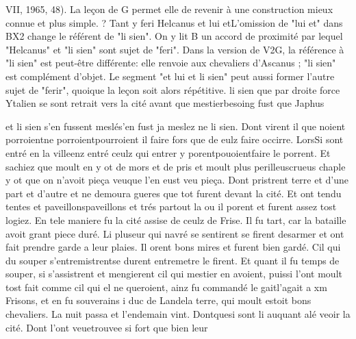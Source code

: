 \documentclass{article}
\begin{document}
\begin{pages}
                     VII, 1965, 48). La leçon de G permet elle de revenir à une construction mieux
                     connue et plus simple. ? Tant 
                  y
               feri Helcanus et 
                  lui etL'omission de "lui et" dans BX2 change le référent de
                  "li sien". On y lit B un accord de proximité par lequel "Helcanus" et "li sien"
                  sont sujet de "feri". Dans la version de V2G, la référence à "li sien" est
                  peut-être différente: elle renvoie aux chevaliers d'Ascanus ; "li sien" est
                  complément d'objet. Le segment "et lui et li sien" peut aussi former l'autre sujet
                  de "ferir", quoique la leçon soit alors répétitive. li sien que par droite
               force Ytalien se sont retrait vers la cité avant que 
                  mestierbesoing fust que Japhus
               
                  et li sien s’en fussent meslés'en fust ja meslez ne li sien. Dont virent il que noient 
                  porroientne porroientpourroient il faire 
                  fors que de eulz faire occirre. 
                  LorsSi sont entré 
                  en la villeenz entré ceulz qui 
                  entrer y 
                        porentpouoientfaire le porrent. Et sachiez que moult en y ot de mors et de pris 
                  et moult plus 
                        perilleuscrueus chaple 
                        y ot que on n’avoit pieça veuque l'en eust veu pieça. Dont pristrent terre et d’une part et d’autre et ne demoura gueres que tot
               furent devant la cité. Et ont tendu 
                  tentes et paveillonspaveillons et trés partout la ou il porent et furent assez tost logiez. En tele maniere fu la cité assise de ceulz de Frise. Il fu tart, car la bataille avoit grant piece duré. Li pluseur
               qui navré se sentirent se firent desarmer et ont fait prendre garde a leur plaies. Il
               orent bons mires et furent bien gardé. Cil qui du souper 
                  s’entremistrentse durent entremetre le firent. Et quant il fu temps de souper, 
                  si s’assistrent et mengierent cil qui mestier en avoient,
                     puissi l'ont moult tost fait comme cil qui el ne queroient, ainz fu commandé 
                  le gaitl'agait a xm
               Frisons, et en fu souverains i
               duc de 
                        Landela terre, qui moult estoit bons chevaliers. La nuit passa et
               l’endemain vint. 
                  Dontquesi sont li auquant alé veoir la cité. Dont l’ont 
                  veuetrouvee si fort que bien leur 


\end{pages}
\end{document}
